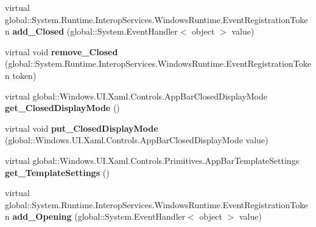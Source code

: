 \begin{DoxyCompactItemize}
\item 
\mbox{\label{class_windows_1_1_u_i_1_1_xaml_1_1_controls_1_1_app_bar_a4a1f77613cd6cf4250c8b5d04fb9f853}} 
virtual global\+::\+System.\+Runtime.\+Interop\+Services.\+Windows\+Runtime.\+Event\+Registration\+Token {\bfseries add\+\_\+\+Closed} (global\+::\+System.\+Event\+Handler$<$ object $>$ value)
\item 
\mbox{\label{class_windows_1_1_u_i_1_1_xaml_1_1_controls_1_1_app_bar_a3ae78268589fb871f3fba9dbb13e32b4}} 
virtual void {\bfseries remove\+\_\+\+Closed} (global\+::\+System.\+Runtime.\+Interop\+Services.\+Windows\+Runtime.\+Event\+Registration\+Token token)
\item 
\mbox{\label{class_windows_1_1_u_i_1_1_xaml_1_1_controls_1_1_app_bar_a46d37ed2b539c5c23c95c2f3d1bbe080}} 
virtual global\+::\+Windows.\+U\+I.\+Xaml.\+Controls.\+App\+Bar\+Closed\+Display\+Mode {\bfseries get\+\_\+\+Closed\+Display\+Mode} ()
\item 
\mbox{\label{class_windows_1_1_u_i_1_1_xaml_1_1_controls_1_1_app_bar_a1a13c7a737fd9dc3411f69e637231233}} 
virtual void {\bfseries put\+\_\+\+Closed\+Display\+Mode} (global\+::\+Windows.\+U\+I.\+Xaml.\+Controls.\+App\+Bar\+Closed\+Display\+Mode value)
\item 
\mbox{\label{class_windows_1_1_u_i_1_1_xaml_1_1_controls_1_1_app_bar_a2e23c12e2a789785cc3543b45ad5e974}} 
virtual global\+::\+Windows.\+U\+I.\+Xaml.\+Controls.\+Primitives.\+App\+Bar\+Template\+Settings {\bfseries get\+\_\+\+Template\+Settings} ()
\item 
\mbox{\label{class_windows_1_1_u_i_1_1_xaml_1_1_controls_1_1_app_bar_a355e1e4a38bea8069ad912132936c3e5}} 
virtual global\+::\+System.\+Runtime.\+Interop\+Services.\+Windows\+Runtime.\+Event\+Registration\+Token {\bfseries add\+\_\+\+Opening} (global\+::\+System.\+Event\+Handler$<$ object $>$ value)
\item 
\mbox{\label{class_windows_1_1_u_i_1_1_xaml_1_1_controls_1_1_app_bar_a1912d3027c4521c8dcda380a853d656e}} 

\end{DoxyCompactItemize}
